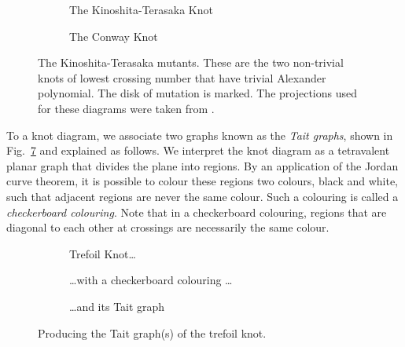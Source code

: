 \documentclass[12pt]{report}
\theoremstyle{upright}
\begin{document}
\begin{figure}[hbt!]
	\centering
	\hspace*{\fill}
	\begin{subfigure}[b]{0.4 \textwidth}
		\centering
		\def\svgscale{0.25}
		
		\caption{The Kinoshita-Terasaka Knot}
		\label{fig:kinoshita-terasaka-knot}
	\end{subfigure}
	\hspace*{\fill} \hspace*{\fill}	\hspace*{\fill}
	\begin{subfigure}[b]{0.4 \textwidth}
		\centering
		\def\svgscale{0.25}
		
		\caption{The Conway Knot}
		\label{fig:conway-knot}
	\end{subfigure}
	\hspace*{\fill} 
	\caption{The Kinoshita-Terasaka mutants. These are the two non-trivial knots of lowest crossing number that have trivial Alexander polynomial. The disk of mutation is marked. The projections used for these diagrams were taken from \cite[Fig.~2.32]{the-knot-book}.}
	\label{fig:kinoshita-terasaka-mutants}
\end{figure}

To a knot diagram, we associate two graphs known as the \textit{Tait graphs}, shown in Fig.~\ref{fig:tait-example} and explained as follows. We interpret the knot diagram as a tetravalent planar graph that divides the plane into regions. By an application of the Jordan curve theorem, it is possible to colour these regions two colours, black and white, such that adjacent regions are never the same colour. Such a colouring is called a \textit{checkerboard colouring}. Note that in a checkerboard colouring, regions that are diagonal to each other at crossings are necessarily the same colour.

\begin{figure}[hbt]
	\centering
	\hspace*{\fill}
	\begin{subfigure}[b]{0.3 \textwidth}
		\centering
		\def\svgscale{0.2}
		
		\caption{Trefoil Knot\dots}
		\label{fig:trefoil-blank}
	\end{subfigure}
	\hspace*{\fill}
	\begin{subfigure}[b]{0.3 \textwidth}
		\centering
		\def\svgscale{0.2}
		
		\caption{\dots with a checkerboard colouring \dots}
		\label{fig:trefoil-checker}
	\end{subfigure}
	\hspace*{\fill}
	\begin{subfigure}[b]{0.3 \textwidth}
		\centering
		\def\svgscale{0.2}
		
		\caption{\dots and its Tait graph}
		\label{fig:trefoil-checker-tait}
	\end{subfigure}
	\hspace*{\fill}
	\caption{Producing the Tait graph(s) of the trefoil knot.}
	\label{fig:tait-example}
\end{figure}
\end{document}
